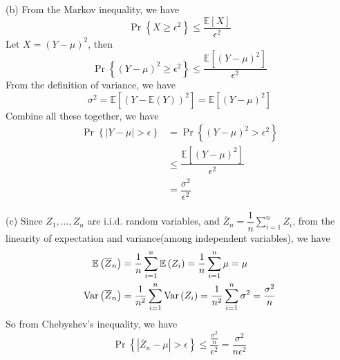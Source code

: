(b) From the Markov inequality, we have
$$\Pr\left\{X\geq \epsilon^2\right\}\leq\dfrac{\mathbb{E}[X]}{\epsilon^2}$$
Let $X=(Y-\mu)^2$, then
$$\Pr\left\{(Y-\mu)^2\geq \epsilon^2\right\}\leq\dfrac{\mathbb{E}[(Y-\mu)^2]}{\epsilon^2}$$
From the definition of variance, we have
$$\sigma^2=\mathbb{E}[(Y-\mathbb{E}(Y))^2]=\mathbb{E}[(Y-\mu)^2]$$
Combine all these together, we have
\begin{align*}
\Pr\left\{|Y-\mu|>\epsilon\right\} &= \Pr\left\{(Y-\mu)^2>\epsilon^2\right\} \\
&\leq \dfrac{\mathbb{E}[(Y-\mu)^2]}{\epsilon^2} \\
&= \dfrac{\sigma^2}{\epsilon^2}
\end{align*}

(c) Since $Z_1,\ldots,Z_n$ are i.i.d. random variables, and $\overline{Z}_n=\dfrac1n\sum\limits_{i=1}^nZ_i$, from the linearity of expectation and variance(among independent variables), we have
\begin{align*}
\mathbb{E}\left(\overline{Z}_n\right) &= \dfrac{1}{n}\sum\limits_{i=1}^n\mathbb{E}\left(Z_i\right) = \dfrac{1}{n}\sum\limits_{i=1}^n\mu = \mu \\
\mathrm{Var}\left(\overline{Z}_n\right) &= \dfrac{1}{n^2}\sum\limits_{i=1}^n\mathrm{Var}\left(Z_i\right) = \dfrac{1}{n^2}\sum\limits_{i=1}^n\sigma^2 = \dfrac{\sigma^2}{n}
\end{align*}
So from Chebyshev's inequality, we have
$$\Pr\left\{|\overline{Z}_n-\mu|>\epsilon\right\} \leq \dfrac{\frac{\sigma^2}{n}}{\epsilon^2} = \dfrac{\sigma^2}{n\epsilon^2}$$

\newpage
